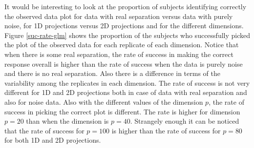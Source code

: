 \documentclass[12]{article}
\begin{document}
It would be interesting to look at the proportion of subjects identifying correctly the observed data plot for data with real separation versus data with purely noise, for 1D projections versus 2D projections and for the different dimensions.
Figure \ref{suc-rate-glm} shows the proportion of the subjects who successfully picked the plot of the observed data for each replicate of each dimension. Notice that when there is some real separation, the rate of success in making the correct response overall is higher than the rate of success when the data is purely noise and there is no real separation. Also there is a difference in terms of the variability among the replicates in each dimension.
 The rate of success is not very different for 1D and 2D projections both in case of data with real separation and also for noise data. %
Also with the different values of the dimension $p$, the rate of success in picking the correct plot is different. The rate is higher for dimension $p = 20$ than when the dimension is $p = 40$. Strangely enough it can be noticed that the rate of success for $p = 100$ is higher than the rate of success for $p=80$ for both 1D and 2D projections. 
\end{document}
